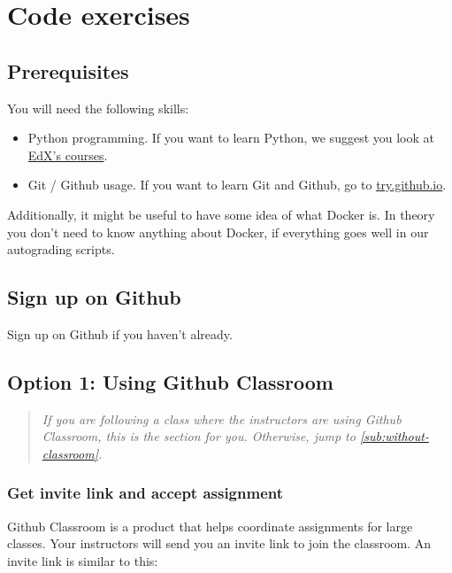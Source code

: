 
\section{\usebox{\chaptergear}
  Code exercises}

\subsection{Prerequisites}

You will need the following skills:

\begin{itemize}
    \item Python programming.
          If you want to learn Python, we suggest you look at
          \href{https://www.edx.org/learn/python}{EdX's courses}.
    \item Git / Github usage.
          If you want to learn Git and Github, go to \href{https://try.github.io/}{try.github.io}.
\end{itemize}

Additionally, it might be useful to have some idea of what Docker is.
In theory you don't need to know anything about Docker, if everything goes well in our autograding scripts.

\subsection{Sign up on Github}

Sign up on Github if you haven't already.

\subsection{Option 1: Using Github Classroom}\label{subsec:with-classroom}

\begin{quote}
    \emph{
        If you are following a class where the instructors are using Github Classroom,
        this is the section for you.
        Otherwise, jump to \cref{sub:without-classroom}.
    }
\end{quote}

\subsubsection{Get invite link and accept assignment}
Github Classroom is a product that helps coordinate assignments for large classes.
%
Your instructors will send you an invite link to join the classroom.
An invite link is similar to this:

